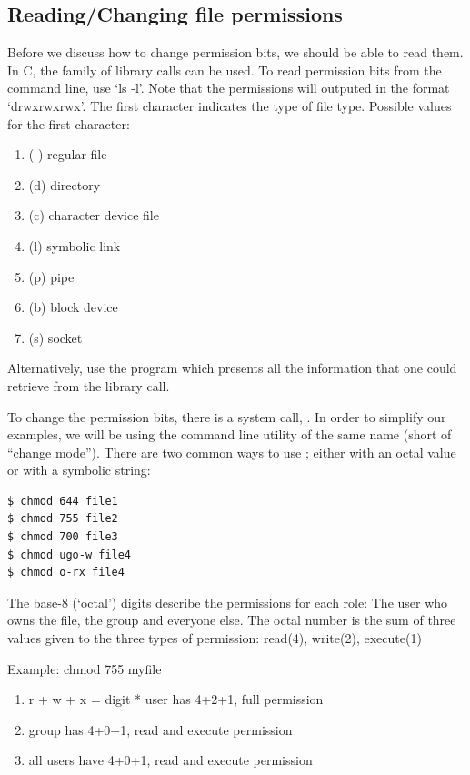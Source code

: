 \subsection{Reading/Changing file permissions}

Before we discuss how to change permission bits, we should be able to read them. In C, the  family of library calls can be used. To read permission bits from the command line, use `ls -l'. Note that the permissions will outputed in the format `drwxrwxrwx'. The first character indicates the type of file type. Possible values for the first character:

\begin{enumerate}
\item (-) regular file
\item (d) directory
\item (c) character device file
\item (l) symbolic link
\item (p) pipe
\item (b) block device
\item (s) socket
\end{enumerate}

Alternatively, use the program  which presents all the information that one could retrieve from the  library call.

To change the permission bits, there is a system call, . In order to simplify our examples, we will be using the command line utility of the same name  (short of ``change mode''). There are two common ways to use  ; either with an octal value or with a symbolic string:

\begin{lstlisting}
$ chmod 644 file1
$ chmod 755 file2
$ chmod 700 file3
$ chmod ugo-w file4
$ chmod o-rx file4
\end{lstlisting}

The base-8 (`octal') digits describe the permissions for each role: The user who owns the file, the group and everyone else. The octal number is the sum of three values given to the three types of permission: read(4), write(2), execute(1)

Example: chmod 755 myfile

\begin{enumerate}
\item r + w + x = digit * user has 4+2+1, full permission
\item group has 4+0+1, read and execute permission
\item all users have 4+0+1, read and execute permission
\end{enumerate}

